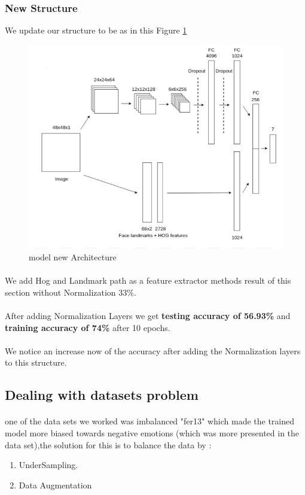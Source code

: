 \subsubsection{New Structure}
We update our structure to be as in this Figure \ref{arch}
\begin{figure}
	\centering
	\includegraphics[width=.7\textwidth]{Arch.png}
	\caption{model new Architecture}
	\label{arch}
\end{figure} 
\paragraph{}
We add Hog and Landmark path as a feature extractor methods 
result of this section without Normalization 33\%.
\paragraph{}
After adding Normalization Layers we get \textbf{testing accuracy of 56.93\%} and \textbf{training accuracy of 74\%} after 10 epochs. 
\paragraph{}
We notice an increase now of the accuracy after adding the Normalization layers to this structure.

\subsection{Dealing with datasets problem}
\paragraph{}
one of the data sets we worked was imbalanced "fer13" which made the trained model more biased towards negative emotions (which was more presented in the data set),the solution for this is to balance the data by :
\begin{enumerate}
	\item UnderSampling.
	\item Data Augmentation
\end{enumerate}
